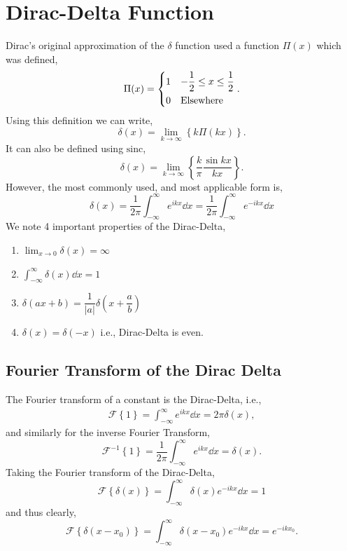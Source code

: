 \documentclass{book}
\begin{document}
\section{Dirac-Delta Function}
Dirac's original approximation of the $\delta$ function used a function $\Pi(x)$ which was defined,
\begin{equation}
	\Pi(x) = \begin{dcases}
		1 & -\frac{1}{2} \leq x \leq \frac{1}{2} \\
		0 & \text{Elsewhere}
	\end{dcases}.
\end{equation}
Using this definition we can write,
\begin{equation}
	\delta(x) = \lim_{k \to \infty} \left\{k\Pi(kx)\right\}.
\end{equation}
It can also be defined using $\mathrm{sinc}$,
\begin{equation}
	\delta(x) = \lim_{k \to \infty}\left\{\frac{k}{\pi}\frac{\sin{kx}}{kx}\right\}.
\end{equation}
However, the most commonly used, and most applicable form is,
\begin{equation}
	\boxed{\delta(x) = \frac{1}{2\pi}\int_{-\infty}^{\infty}e^{ikx}\dd{x} = \frac{1}{2\pi}\int_{-\infty}^{\infty}e^{-ikx}\dd{x}}
\end{equation}
We note 4 important properties of the Dirac-Delta,
\begin{enumerate}
	\item $\displaystyle \lim_{x \to 0}\delta(x) = \infty$ 
	\item $\displaystyle \int_{-\infty}^{\infty}\delta(x)\dd{x} = 1$
	\item $\displaystyle \delta(ax + b) = \dfrac{1}{|a|}\delta\left(x + \dfrac{a}{b}\right)$
	\item $\delta(x) = \delta(-x)$ i.e., Dirac-Delta is even.
\end{enumerate}
\subsection{Fourier Transform of the Dirac Delta}
The Fourier transform of a constant is the Dirac-Delta, i.e.,
\begin{align}
	\mathscr{F}\left\{1\right\} = \int_{-\infty}^{\infty}e^{ikx}\dd{x} = 2\pi\delta(x),
\end{align}
and similarly for the inverse Fourier Transform,
\begin{equation}
	\mathscr{F}^{-1}\left\{1\right\} = \frac{1}{2\pi}\int_{-\infty}^{\infty}e^{ikx}\dd{x} = \delta(x).
\end{equation}
Taking the Fourier transform of the Dirac-Delta,
\begin{equation}
	\mathscr{F}\left\{\delta(x)\right\} = \int_{-\infty}^{\infty}\delta(x)e^{-ikx}\dd{x} = 1
\end{equation}
and thus clearly,
\begin{equation}
	\mathscr{F}\left\{\delta(x - x_0)\right\} = \int_{-\infty}^{\infty}\delta(x - x_0)e^{-ikx}\dd{x} = e^{-ikx_0}.
\end{equation}
\end{document}
